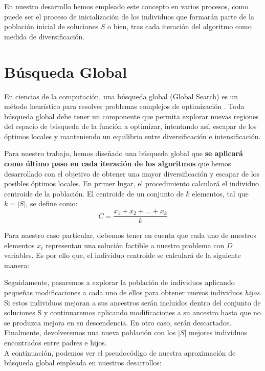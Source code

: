 En nuestro desarrollo hemos empleado este concepto en varios procesos, como puede ser el proceso de inicialización de los individuos que formarán parte de la población inicial de soluciones $S$ o bien, tras cada iteración del algoritmo como medida de diversificación. 

\section{Búsqueda Global}\label{sec:BG}

En ciencias de la computación, una búsqueda global (Global Search) es un método heurístico para resolver problemas complejos de optimización \cite{GlobalSearch, GlobalSearch2, GlobalSearch3}. %
%
Toda búsqueda global debe tener un componente que permita explorar nuevas regiones del espacio de búsqueda de la función a optimizar, intentando así, escapar de los óptimos locales y manteniendo un equilibrio entre diversificación e intensificación.

Para nuestro trabajo, hemos diseñado una búsqueda global que \textbf{se aplicará como último paso en cada iteración de los algoritmos} que hemos desarrollado con el objetivo de obtener una mayor diversificación y escapar de los posibles óptimos locales. En primer lugar, el procedimiento calculará el individuo centroide de la población. El centroide de un conjunto de $k$ elementos, tal que $k = \left | S \right |$, se define como:
\begin{equation}\label{centroide}
    C = \frac{x_{1} + x_{2} + ... + x_{k}}{k}
\end{equation}

Para nuestro caso particular, debemos tener en cuenta que cada uno de nuestros elementos $x_{i}$ representan una solución factible a nuestro problema con $D$ variables. Es por ello que, el individuo centroide se calculará de la siguiente manera: 

Seguidamente, pasaremos a explorar la población de individuos aplicando pequeñas modificaciones a cada uno de ellos para obtener nuevos individuos \textit{hijos}. Si estos individuos mejoran a sus ancestros serán incluidos dentro del conjunto de soluciones S y continuaremos aplicando modificaciones a su ancestro hasta que no se produzca mejora en su descendencia. En otro caso, serán descartados.
Finalmente, devolveremos una nueva población con los $|S|$ mejores individuos encontrados entre padres e hijos. \\
A continuación, podemos ver el pseudocódigo de nuestra aproximación de búsqueda global empleada en nuestros desarrollos: \\


